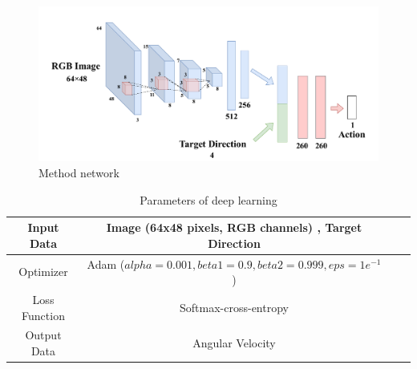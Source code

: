\begin{figure}[h]
    \centering
    \includegraphics[width = 13cm]{./figs/network.pdf}
    \caption{Method network}
    \label{fig::methodnetwork}
\end{figure}
\begin{table}[htb]
    \centering
    \caption{Parameters of deep learning}
    \begin{tabular}{|c|c|c|c|}
    \hline
    Input Data    & Image (64x48 pixels, RGB channels) , Target Direction                                             \\ \hline
    Optimizer     & Adam ($alpha = 0.001, beta1 = 0.9, beta2 = 0.999, eps = 1e^{-1}$ )  \\ \hline
    Loss Function & Softmax-cross-entropy                                                            \\ \hline
    Output Data   & Angular Velocity                                              \\ \hline
    \end{tabular}
    \label{tb::param}
    \end{table}





